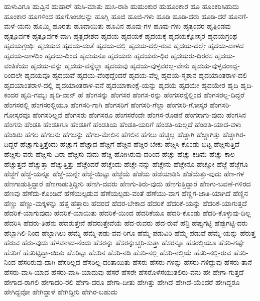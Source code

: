 {ಹುಳುವಿಗೂ
ಹುವ್ವಿನ
ಹುಷಾರ್
ಹುಸಿ-ಮಾತು
ಹುಸಿ-ರಾಶಿ
ಹುಹುಂಕುರ
ಹುಹೂಂಕಾರ
ಹೂ
ಹೂಂಕರಿಸಿಹುದು
ಹೂಂಕಾರ
ಹೂಗಳಿಂದ
ಹೂಗೊಂಚಲನ್ನು
ಹೂಗ್ಲಿ
ಹೂಜಿ
ಹೂಜಿ-ಗಳು
ಹೂಡಿ
ಹೂಡಿ-ದರು
ಹೂಡಿ-ದರೆ
ಹೂನಗೆ-ಮಳೆ-ಯನು
ಹೂಮ್ಮಿ
ಹೂರತು
ಹೂವಾಯಿತು
ಹೂವಿನ
ಹೂವು-ಗಳ
ಹೂವು-ಗಳು
ಹೃತ್ಕಂದರ
ಹೃತ್ಪಿಂಡವು
ಹೃತ್ಪೂರ್ವಕ
ಹೃತ್ಪೂರ್ವಕ-ವಾಗಿ
ಹೃತ್ಪ್ರದೇಶದ
ಹೃದಯ
ಹೃದಯಕೆ
ಹೃದಯಕ್ಕೆ
ಹೃದಯಕ್ಕೋಸ್ಕರ
ಹೃದಯಗ್ರಂಥ
ಹೃದಯಗ್ರಂಥಿಃ
ಹೃದಯದ
ಹೃದಯ-ದಂತೆ
ಹೃದಯ-ದಲ್ಲಿ
ಹೃದಯ-ದಲ್ಲಿ-ರುವ
ಹೃದಯ-ದಲ್ಲೇ
ಹೃದಯ-ದಾಳದ
ಹೃದಯ-ದಾಳದಿಂ
ಹೃದಯ-ದಿಂದ
ಹೃದಯನೂ
ಹೃದಯರು
ಹೃದಯರು-ಧಿರ
ಹೃದಯರು-ಧಿರರಸ
ಹೃದಯ-ವಂತಿಕೆಯು
ಹೃದಯ-ವನ್ನು
ಹೃದಯ-ವನ್ನೆಲ್ಲಾ
ಹೃದಯವು
ಹೃದಯ-ವುಳ್ಳವರಲ್ಲ-ವೇನು
ಹೃದಯ-ವುಳ್ಳವರಾದ್ದ-ರಿಂದಲೇ
ಹೃದಯವೂ
ಹೃದಯವೆ
ಹೃದಯ-ವೆಂಥದ್ದೆಂದರೆ
ಹೃದಯ-ವೆಲ್ಲ
ಹೃದಯ-ಸ್ಮಶಾನ
ಹೃದಯಾಂತರಾಳ-ದಲಿ
ಹೃದಯಾಂತರಾಳ-ದಲ್ಲಿ
ಹೃದಯಾಂತರಾಳ-ವನೆ
ಹೃದಯಾಕಾಂಕ್ಷೆ-ಯನ್ನು
ಹೃದಯೆ
ಹೃದಯೇ
ಹೃದಯೇರ
ಹೃದಿ
ಹೃದಿ-ಕಂದರ
ಹೃದಿ-ಗಮ್ಯಃ
ಹೃದಿ-ವಾನ್
ಹೆ
ಹೆಂಗಸನ್ನು
ಹೆಂಗಸರ
ಹೆಂಗಸ-ರನ್ನು
ಹೆಂಗಸರನ್ನೆಲ್ಲಿಂದ
ಹೆಂಗಸರಲ್ಲ-ದಿದ್ದರೆ
ಹೆಂಗಸರಲ್ಲಿ
ಹೆಂಗಸರಲ್ಲಿಯೂ
ಹೆಂಗಸರಿ-ಗಾಗಿ
ಹೆಂಗಸರಿಗೆ
ಹೆಂಗಸರಿ-ಗೆಲ್ಲಾ
ಹೆಂಗಸರಿ-ಗೋಸ್ಕರ
ಹೆಂಗಸರಿ-ಗೋಸ್ಕರವೂ
ಹೆಂಗಸರಿಲ್ಲವೆ
ಹೆಂಗಸರು
ಹೆಂಗಸರೂ
ಹೆಂಗಸರೆಂದೇ
ಹೆಂಗಸ-ರೊಡನೆ
ಹೆಂಗಸಾಗು-ವುದು
ಹೆಂಗಸಿನ
ಹೆಂಗಸು
ಹೆಂಡತಿ
ಹೆಂಡತಿಗೂ
ಹೆಂಡತಿಗೆ
ಹೆಂಡತಿಯ
ಹೆಂಡತಿ-ಯರಿಗೆ
ಹೆಂಡತಿ-ಯಲ್ಲದೆ
ಹೆಂಡತಿ-ಯಾದ-ವಳು
ಹೆಂಡಿರು
ಹೆಗಲ
ಹೆಗಲನು
ಹೆಗಲನ್ನು
ಹೆಗಲ-ಮೇಲಿನ
ಹೆಗಲಿನ
ಹೆಗಲು
ಹೆಚ್ಚಲ್ಲ
ಹೆಚ್ಚಾಗಿ
ಹೆಚ್ಚಾಗಿತ್ತು
ಹೆಚ್ಚಾಗಿರ-ದಿದ್ದರೆ
ಹೆಚ್ಚಾಗುತ್ತಿತ್ತೆಂದು
ಹೆಚ್ಚಾಗೆ
ಹೆಚ್ಚಾದ
ಹೆಚ್ಚಿಗೆ
ಹೆಚ್ಚಿನ
ಹೆಚ್ಚಿರ-ಬೇಕು
ಹೆಚ್ಚಿಸಿ-ಕೊಂಡು-ಬಿಟ್ಟ
ಹೆಚ್ಚಿಸುತ್ತಿದೆ
ಹೆಚ್ಚಿಸು-ವರು
ಹೆಚ್ಚಿಸು-ವಿರಾ
ಹೆಚ್ಚಿಸು-ವುದು
ಹೆಚ್ಚಿ-ಹೋಗಿರುವು-ದರಿಂದ
ಹೆಚ್ಚು
ಹೆಚ್ಚು-ಕಡಿಮೆ
ಹೆಚ್ಚು-ಕಾಲ
ಹೆಚ್ಚುತ್ತದೆ
ಹೆಚ್ಚುತ್ತಾ
ಹೆಚ್ಚುತ್ತಿತ್ತು
ಹೆಚ್ಚೆಂದರೆ
ಹೆಚ್ಚೆಂದು
ಹೆಚ್ಚೇ-ನನ್ನು
ಹೆಚ್ಚೇನು
ಹೆಚ್ಚೇನೂ
ಹೆಚ್ಚೋ
ಹೆಜ್ಜೆ
ಹೆಜ್ಜೆಗೂ
ಹೆಜ್ಜೆಗೆ
ಹೆಜ್ಜೆ-ಯನ್ನೂ
ಹೆಜ್ಜೆ-ಯನ್ನೇ
ಹೆಜ್ಜೆ-ಯಿಟ್ಟು
ಹೆಜ್ಜೆಯೆ
ಹೆಡೆಯ
ಹೆಡೆಯಾಡಿಸಿ
ಹೆಡೆಯೆತ್ತು-ವುದು
ಹೆಣ-ಗಳ
ಹೆಣಗಾಡುತ್ತಿದ್ದಾರೆ
ಹೆಣಗಾಡುತ್ತಿದ್ದೀರಿ
ಹೆಣಗಿ-ದವರು
ಹೆಣಗು-ತಿರು-ವುದು
ಹೆಣಗುತ್ತಿದ್ದಾರೆ
ಹೆಣಗು-ಬವಣೆ-ಗಳಿರದ
ಹೆಣವು
ಹೆಣೆದು-ಕೊಂಡಿದೆ
ಹೆಣೆಯಲ್ಪಡುವ
ಹೆಣೆಯಲ್ಪಡು-ವಂತೆ
ಹೆಣೆಯು-ವಾಗ
ಹೆಣ್ಣಿಗ-ಜಾತಿ-ಯಾಗಿದೆ
ಹೆಣ್ಣಿನ
ಹೆಣ್ಣು
ಹೆಣ್ಣು-ಮಕ್ಕಳನ್ನು
ಹೆತ್ತ
ಹೆತ್ತಾರು
ಹೆದರದೆ
ಹೆದರ-ಬೇಕಾದ
ಹೆದರಿಕೆ
ಹೆದರಿಕೆ-ಯನ್ನು
ಹೆದರಿಕೆ-ಯಾಗುತ್ತದೆ
ಹೆದರಿಕೆ-ಯಾಗುವುದು
ಹೆದರಿಕೆ-ಯಾಯಿತು
ಹೆದರಿಕೆ-ಯಿಂದ
ಹೆದರಿಕೆಯೂ
ಹೆದರಿ-ಕೊಂಡು
ಹೆದರಿ-ಕೊಳ್ಳುವು-ದಿಲ್ಲ
ಹೆದರಿಸಿ
ಹೆದರು-ತಿಹೆನು
ಹೆದರುತ್ತೇನೆ
ಹೆದರುತ್ತೇವೆಯೆ
ಹೆದ-ರುವರು
ಹೆದ-ರುವೆ
ಹೆನ್ರಿ
ಹೆಪ್ಪುಗಟ್ಟಿ
ಹೆಪ್ಪುಗಟ್ಟಿ-ದರು
ಹೆಬ್ಬಾಗಿಲಿ-ನಿಂದ
ಹೆಬ್ಬಾಗಿಲು
ಹೆಮ್ಮೆ
ಹೆಮ್ಮೆ-ಪಡು-ವವ-ರಿಗೂ
ಹೆಮ್ಮೆ-ಪಡುವಿರಿ
ಹೆಮ್ಮೆ-ಪಡುವೆ
ಹೆಮ್ಮೆ-ಯನ್ನು
ಹೆರುತ್ತ
ಹೆರುವ
ಹೆರು-ವುದು
ಹೆಳವನಾದ-ನೆಂದು
ಹೆಸರನ್ನು
ಹೆಸರನ್ನುಚ್ಚರಿ-ಸುತ್ತಾ
ಹೆಸರನ್ನೂ
ಹೆಸರಲ್ಲಿಯೂ
ಹೆಸರಿ-ಗಷ್ಟೇ
ಹೆಸರಿಗೆ
ಹೆಸರಿಟ್ಟಿದ್ದಾ-ಯಿತು
ಹೆಸರಿಟ್ಟು
ಹೆಸರಿನ
ಹೆಸರಿ-ನಡಿ
ಹೆಸರಿ-ನಲ್ಲಿ
ಹೆಸರಿ-ನಲ್ಲಿಯೆ
ಹೆಸರಿ-ನಲ್ಲಿ-ರುವ
ಹೆಸರಿ-ನಿಂದ
ಹೆಸರಿರುವು-ದಾಗಿ
ಹೆಸರಿಲ್ಲದ
ಹೆಸರಿಲ್ಲ-ದಂತಾಯಿತು
ಹೆಸರು
ಹೆಸರು-ಗಳನ್ನು
ಹೆಸರು-ಗಳಿದ್ದುವು
ಹೆಸರು-ತಾನೆ
ಹೆಸರು-ವಾಸಿ-ಯಾದ
ಹೆಸರು-ವಾಸಿ-ಯಾದುವು
ಹೆಸರೆ
ಹೆಸರೇ
ಹೆಸರೊಳೆಸೆಯುತಲಿರು-ವನು
ಹೇ
ಹೇಗಾ-ಗುತ್ತದೆ
ಹೇಗಾದ-ರಾಗಲಿ
ಹೇಗಾದರಿ-ರಲಿ
ಹೇಗಾ-ದರೂ
ಹೇಗಾ-ದೀತು
ಹೇಗಿತ್ತು
ಹೇಗಿದೆ
ಹೇಗಿದೆ-ಯೆಂದರೆ
ಹೇಗಿದ್ದರೂ
ಹೇಗಿದ್ದವೋ
ಹೇಗಿದ್ದಾಳೆ
ಹೇಗಿದ್ದೀರಿ
ಹೇಗಿರ-ಬಹುದು
}
